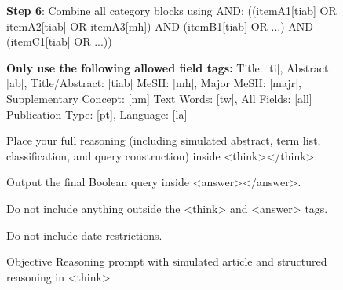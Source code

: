 \begin{figure}[ht!]
\begin{PromptBox}
		\textbf{Step 6}: Combine all category blocks using AND:
		((itemA1[tiab] OR itemA2[tiab] OR itemA3[mh]) AND (itemB1[tiab] OR ...) AND (itemC1[tiab] OR ...))
		
		\textbf{Only use the following allowed field tags:}
		Title: [ti], Abstract: [ab], Title/Abstract: [tiab]
		MeSH: [mh], Major MeSH: [majr], Supplementary Concept: [nm]
		Text Words: [tw], All Fields: [all]
		Publication Type: [pt], Language: [la]
		
		Place your full reasoning (including simulated abstract, term list, classification, and query construction) inside <think></think>.
		
		Output the final Boolean query inside <answer></answer>.
		
		Do not include anything outside the <think> and <answer> tags.
		
		Do not include date restrictions.
	\end{PromptBox}
	
	\caption{Objective Reasoning prompt with simulated article and structured reasoning in <think>}
	\label{fig:prompt-objective}
\end{figure}